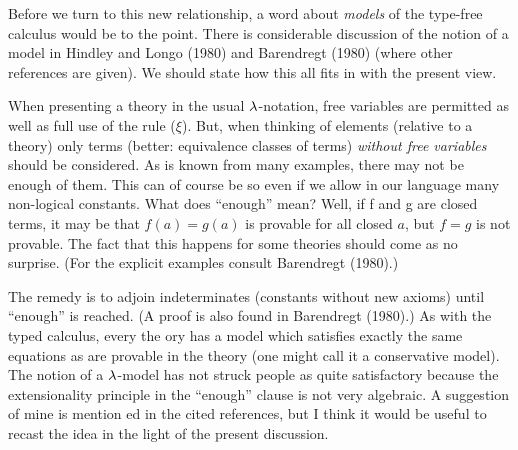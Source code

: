 Before we turn to this new relationship, a word about {\it models} of the type-free calculus would be to the point. There is considerable discussion of the notion of a model in Hindley and Longo (1980) and Barendregt (1980) (where other references are given). We should state how this all fits in with the present view.

When presenting a theory in the usual $\lambda$-notation, free variables are permitted as well as full use of the rule ($\xi$). But, when thinking of elements (relative to a theory) only terms (better: equivalence classes of terms) {\it without free variables} should be considered. As is known from many examples, there may not be enough of them. This can of course be so even if we
allow in our language many non-logical constants. What does
``enough'' mean? Well, if f and g are closed terms, it may be
that $f(a) = g(a)$ is provable for all closed $a$, but $f = g$ is not provable. The fact that this happens for some theories should come as no surprise. (For the explicit examples consult Barendregt (1980).)

The remedy is to adjoin indeterminates (constants without
new axioms) until ``enough'' is reached. (A proof is also found
in Barendregt (1980).) As with the typed calculus, every the ory has a model which satisfies exactly the same equations as
are provable in the theory (one might call it a conservative
model).
The notion of a $\lambda$-model has not struck people as quite satisfactory because the extensionality principle in the ``enough'' clause is not very algebraic. A suggestion of mine is mention ed in the cited references, but I think it would be useful to recast the idea in the light of the present discussion.

